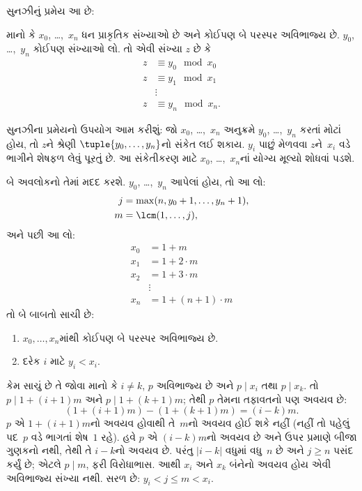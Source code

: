 \documentclass[../../../include/open-logic-section]{subfiles}
\begin{document}
સુનઝીનું પ્રમેય આ છે:
\begin{thm}
માનો કે $x_0$, \dots,~$x_n$ ધન પ્રાકૃતિક સંખ્યાઓ છે અને
કોઈપણ બે પરસ્પર અવિભાજ્ય છે.
$y_0$, \dots,~$y_n$ કોઈપણ
સંખ્યાઓ લો. તો એવી સંખ્યા $z$
છે કે
\begin{align*}
z & \equiv y_0 \mod x_0 \\
z & \equiv y_1 \mod x_1 \\
& \vdots  \\
z & \equiv y_n \mod x_n.
\end{align*}
\end{thm}

સુનઝીના પ્રમેયનો ઉપયોગ આમ કરીશું:
જો $x_0$, \dots,~$x_n$ અનુક્રમે
$y_0$, \dots,~$y_n$ કરતાં મોટાં
હોય, તો $z$ને શ્રેણી
$\tuple{y_0, \dots,y_n}$નો
સંકેત લઈ શકાય. $y_i$ પાછું
મેળવવા $z$ને~$x_i$ વડે ભાગીને
શેષફળ લેવું પૂરતું છે. આ
સંકેતીકરણ માટે $x_0$,
\dots,~$x_n$નાં યોગ્ય મૂલ્યો
શોધવાં પડશે.

બે અવલોકનો તેમાં મદદ કરશે.
$y_0$, \dots,~$y_n$ આપેલાં હોય,
તો આ લો:
\begin{align*}
j &= \max(n, y_0 + 1, \dots, y_n + 1), \\
m &= \lcm(1,\dots,j),
\end{align*}
અને પછી આ લો:
\begin{align*}
x_0 & = 1 + m \\
x_1 & = 1 + 2 \cdot m \\
x_2 & = 1 + 3 \cdot m \\
& \vdots  \\
x_n & = 1 + (n+1) \cdot m
\end{align*}
તો બે બાબતો સાચી છે:
\begin{enumerate}
\item{} $x_0,\dots,x_n$માંથી કોઈપણ બે પરસ્પર અવિભાજ્ય છે.
\item{} દરેક $i$ માટે $y_i < x_i$.
\end{enumerate}
 કેમ સાચું છે તે
જોવા માનો કે $i\ne k$, $p$ અવિભાજ્ય
છે અને
$p \mid x_i$ તથા $p \mid x_k$.
તો $p \mid 1 + (i+1) m$ અને
$p \mid 1 + (k+1) m$; તેથી $p$
તેમના તફાવતનો પણ અવયવ છે:
\[
(1 + (i+1)m) - (1+ (k+1)m) = (i-k) m.
\]
$p$ એ $1 + (i+1)m$નો અવયવ
હોવાથી તે~$m$નો અવયવ હોઈ
શકે નહીં (નહીં તો પહેલું પદ~$p$
વડે ભાગતાં શેષ~$1$ રહે).
હવે $p$ એ $(i-k)m$નો અવયવ
છે અને ઉપર પ્રમાણે બીજા
ગુણકનો નથી, તેથી તે
$i-k$નો અવયવ છે. પરંતુ
$\left|i-k\right|$ વધુમાં વધુ~$n$
છે અને $j \geq n$ પસંદ કર્યું છે;
એટલે $p \mid m$, ફરી વિરોધાભાસ.
આથી $x_i$ અને $x_k$ બંનેનો
અવયવ હોય એવી અવિભાજ્ય સંખ્યા નથી.
 સરળ છે:
$y_i < j \leq m < x_i$.
\end{document}

